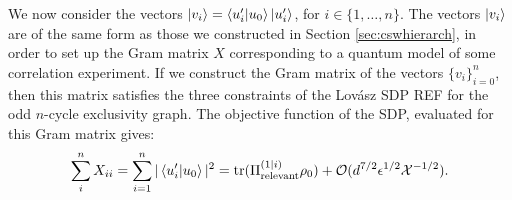 We now consider the vectors
$\ket{v_i}=\bra{u'_i}\ket{u_0}\ket{u'_i}$,
for $i\in\{1,\dots, n\}$. The vectors $\ket{v_i}$ are of the same form as those we constructed in Section \ref{sec:cswhierarch}, in order to set up the Gram matrix $X$ corresponding to a quantum model of some correlation experiment. If we construct the Gram matrix of the vectors $\{v_i\}_{i=0}^n$, then this matrix satisfies the three constraints of the Lovász SDP REF for the odd $n$-cycle exclusivity graph. The objective function of the SDP, evaluated for this Gram matrix gives:
\begin{equation}
\sum_i^n X_{ii} = \sum_{i=1}^n \vert \bra{u'_i}\ket{u_0} \vert^2 = \operatorname{tr}(\Pi_{\text{relevant}}^{(1\vert i)}\rho_0)+\mathcal{O}(d^{7/2}\epsilon^{1/2}\mathcal{X}^{-1/2}).
\end{equation}
